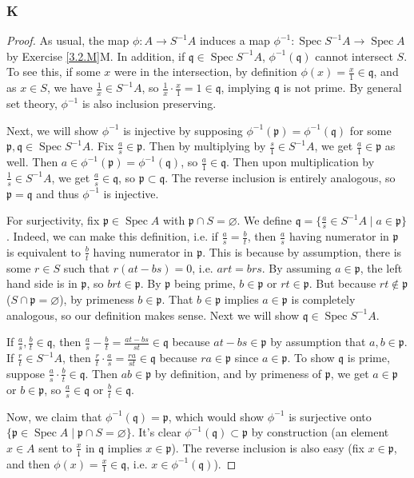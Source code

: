 \documentclass{article}
\newcommand{\frkp}{\mathfrak{p}}
\newcommand{\frkq}{\mathfrak{q}}
\DeclareMathOperator{\Spec}{\mathrm{Spec}}
\let\emptyset\varnothing
\theoremstyle{definition} %
\begin{document}
\subsubsection{K}\label{3.2.K}
\begin{proof}
    As usual, the map $\phi:A\to S^{-1}A$ induces a map $\phi^{-1}:\Spec S^{-1}A \to \Spec A$ by Exercise \ref{3.2.M}M. In addition, if $\frkq \in \Spec S^{-1}A$, $\phi^{-1}(\frkq)$ cannot intersect $S$. To see this, if some $x$ were in the intersection, by definition $\phi(x)=\frac{x}{1}\in \frkq$, and as $x\in S$, we have $\frac{1}{x}\in S^{-1}A$, so $\frac{1}{x}\cdot \frac{x}{1}=1 \in \frkq$, implying $\frkq$ is not prime. By general set theory, $\phi^{-1}$ is also inclusion preserving.

    Next, we will show $\phi^{-1}$ is injective by supposing $\phi^{-1}(\frkp)=\phi^{-1}(\frkq)$ for some $\frkp,\frkq \in \Spec S^{-1}A$. Fix $\frac{a}{s}\in \frkp$. Then by multiplying by $\frac{s}{1}\in S^{-1}A$, we get $\frac{a}{1}\in \frkp$ as well. Then $a\in \phi^{-1}(\frkp)=\phi^{-1}(\frkq)$, so $\frac{a}{1}\in \frkq$. Then upon multiplication by $\frac{1}{s}\in S^{-1}A$, we get $\frac{a}{s}\in \frkq$, so $\frkp\subset \frkq$. The reverse inclusion is entirely analogous, so $\frkp=\frkq$ and thus $\phi^{-1}$ is injective.

    For surjectivity, fix $\frkp\in \Spec A$ with $\frkp \cap S=\emptyset$. We define $\frkq = \{ \frac{a}{s}\in S^{-1}A \mid a \in \frkp \}$. Indeed, we can make this definition, i.e. if $\frac{a}{s}=\frac{b}{t}$, then $\frac{a}{s}$ having numerator in $\frkp$ is equivalent to $\frac{b}{t}$ having numerator in $\frkp$. This is because by assumption, there is some $r\in S$ such that $r(at-bs)=0$, i.e. $art=brs$. By assuming $a\in \frkp$, the left hand side is in $\frkp$, so $brt\in \frkp$. By $\frkp$ being prime, $b\in \frkp$ or $rt\in \frkp$. But because $rt\notin \frkp$ ($S\cap \frkp=\emptyset$), by primeness $b\in \frkp$. That $b\in \frkp$ implies $a\in \frkp$ is completely analogous, so our definition makes sense. Next we will show $\frkq \in \Spec S^{-1}A$.

    If $\frac{a}{s}, \frac{b}{t}\in \frkq$, then $\frac{a}{s}-\frac{b}{t}=\frac{at-bs}{st}\in \frkq$ because $at-bs\in \frkp$ by assumption that $a,b\in \frkp$. If $\frac{r}{t}\in S^{-1}A$, then $\frac{r}{t}\cdot \frac{a}{s}=\frac{ra}{st}\in \frkq$ because $ra\in \frkp$ since $a\in \frkp$. To show $\frkq$ is prime, suppose $\frac{a}{s}\cdot \frac{b}{t}\in \frkq$. Then $ab\in \frkp$ by definition, and by primeness of $\frkp$, we get $a\in \frkp$ or $b\in \frkp$, so $\frac{a}{s}\in \frkq$ or $\frac{b}{t}\in \frkq$.

    Now, we claim that $\phi^{-1}(\frkq)=\frkp$, which would show $\phi^{-1}$ is surjective onto $\{\frkp\in \Spec A \mid \frkp \cap S = \emptyset\}$. It's clear $\phi^{-1}(\frkq)\subset \frkp$ by construction (an element $x\in A$ sent to $\frac{x}{1}$ in $\frkq$ implies $x\in \frkp$). The reverse inclusion is also easy (fix $x\in \frkp$, and then $\phi(x)=\frac{x}{1}\in \frkq$, i.e. $x\in \phi^{-1}(\frkq)$).
\end{proof}
\end{document}
